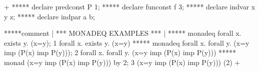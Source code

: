 




\gfexample+
   ***** declare predconst P 1;
   ***** declare funconst f 3;
   ***** declare indvar x y z;
   ***** declare indpar a b;

   *****comment | *** MONADEQ EXAMPLES *** |
   ***** monadeq forall x. exists y. (x=y);
   1   forall x. exists y. (x=y)
   ***** monadeq forall x.  forall y. (x=y imp (P(x) imp P(y)));
   2   forall x.  forall y. (x=y imp (P(x) imp P(y)))
   ***** monad (x=y imp (P(x) imp P(y))) by 2;
   3   (x=y imp (P(x) imp P(y)))  (2)
+
